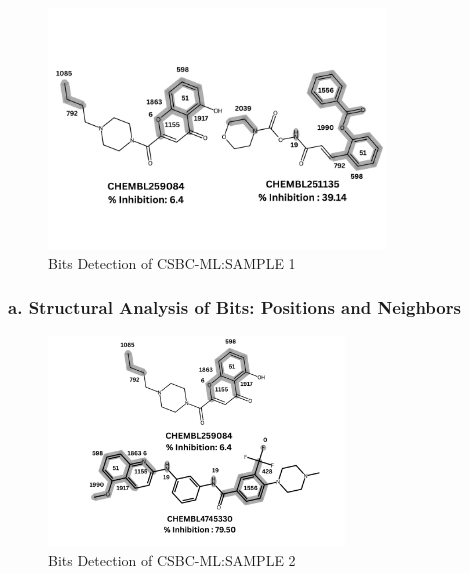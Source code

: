\begin{figure}[h] %
	\centering
	\includegraphics[width=0.8\textwidth]{6_4_vs_39_14_bits_visualization_bw.png} %
	\vspace{-0.7cm}
	\caption{Bits Detection of CSBC-ML:SAMPLE 1}
	\label{fig:bit_visualization_643914} %
\end{figure}

\subsubsection*{a. Structural Analysis of Bits: Positions and Neighbors}

\begin{figure}[h] %
	\centering
	\includegraphics[width=0.7\textwidth]{79_5vs_6_4_bit_visualization_bw.png} %
	\caption{Bits Detection of CSBC-ML:SAMPLE 2}
	\vspace{-0.3cm}
	\label{fig:bit_visualization_7939} %
\end{figure}


